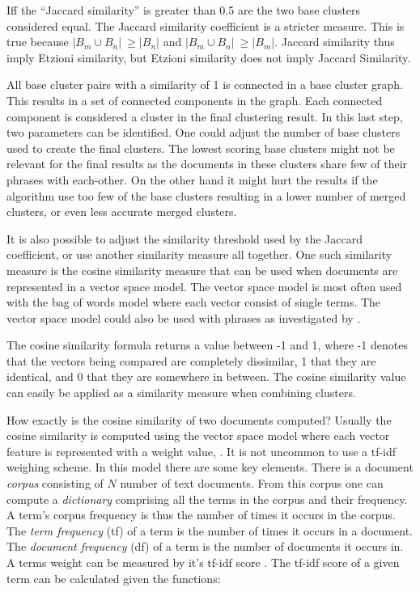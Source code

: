 Iff the ``Jaccard similarity'' is greater than 0.5 are the two base clusters considered equal. The Jaccard similarity coefficient is a stricter measure. This is true because \(\vert B_{m} \cup B_{n} \vert\ \geq \vert B_{n} \vert\) and \(\vert B_{m} \cup B_{n} \vert\ \geq \vert B_{m} \vert\). Jaccard similarity thus imply Etzioni similarity, but Etzioni similarity does not imply Jaccard Similarity.

All base cluster pairs with a similarity of 1 is connected in a base cluster graph. This results in a set of connected components in the graph. Each connected component is considered a cluster in the final clustering result. In this last step, two parameters can be identified. One could adjust the number of base clusters used to create the final clusters. The lowest scoring base clusters might not be relevant for the final results as the documents in these clusters share few of their phrases with each-other. On the other hand it might hurt the results if the algorithm use too few of the base clusters resulting in a lower number of merged clusters, or even less accurate merged clusters.

It is also possible to adjust the similarity threshold used by the Jaccard coefficient, or use another similarity measure all together. One such similarity measure is the cosine similarity measure that can be used when documents are represented in a vector space model. The vector space model is most often used with the bag of words model where each vector consist of single terms. The vector space model could also be used with phrases as investigated by \cite{Chim2007}.

The cosine similarity formula returns a value between -1 and 1, where -1 denotes that the vectors being compared are completely dissimilar, 1 that they are identical, and 0 that they are somewhere in between. The cosine similarity value can easily be applied as a similarity measure when combining clusters.

How exactly is the cosine similarity of two documents computed? Usually the cosine similarity is computed using the vector space model where each vector feature is represented with a weight value, \cite{Manning2009a}. It is not uncommon to use a tf-idf weighing scheme. In this model there are some key elements. There is a document \textit{corpus} consisting of \(N\) number of text documents. From this corpus one can compute a \textit{dictionary} comprising all the terms in the corpus and their frequency. A term's corpus frequency is thus the number of times it occurs in the corpus. The \textit{term frequency} (tf) of a term is the number of times it occurs in a document. The \textit{document frequency} (df) of a term is the number of documents it occurs in. A terms weight can be measured by it's tf-idf score \cite{Manning2009a}. The tf-idf score of a given term can be calculated given the functions:


